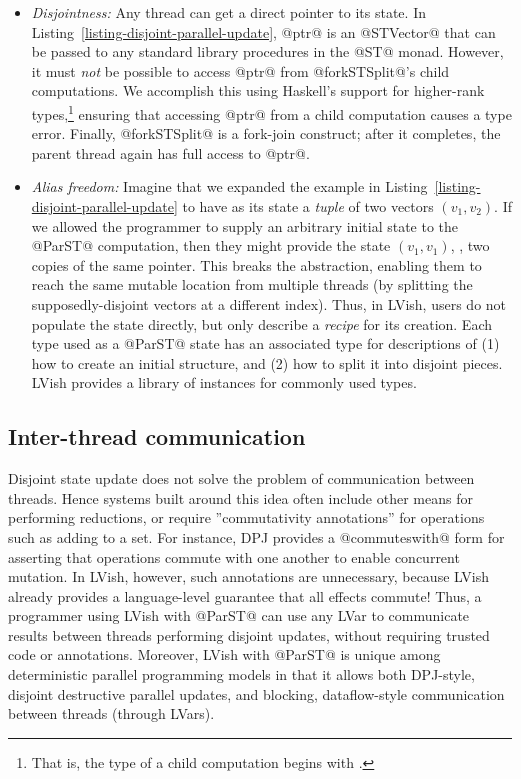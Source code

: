 \begin{itemize}
\item \emph{Disjointness:} Any thread can get a direct pointer to its
  state.  In Listing~\ref{listing-disjoint-parallel-update}, @ptr@ is
  an @STVector@ that can be passed to any standard library procedures
  in the @ST@ monad.  However, it must \emph{not} be possible to
  access @ptr@ from @forkSTSplit@'s child computations.  We accomplish
  this using Haskell's support for higher-rank types,\footnote{That
    is, the type of a child computation begins with .} ensuring that accessing @ptr@ from a child
  computation causes a type error.  Finally, @forkSTSplit@ is a
  fork-join construct; after it completes, the parent thread again has
  full access to @ptr@.

\item \emph{Alias freedom:} Imagine that we expanded the example in
  Listing~\ref{listing-disjoint-parallel-update} to have as its state
  a \emph{tuple} of two vectors $(v_1, v_2)$.  If we allowed the
  programmer to supply an arbitrary initial state to the @ParST@
  computation, then they might provide the state $(v_1, v_1)$, \ie,
  two copies of the same pointer.  This breaks the abstraction,
  enabling them to reach the same mutable location from multiple
  threads (by splitting the supposedly-disjoint vectors at a different
  index).  Thus, in LVish, users do not populate the state directly,
  but only describe a \emph{recipe} for its creation.  Each type used
  as a @ParST@ state has an associated type for descriptions of (1)
  how to create an initial structure, and (2) how to split it into
  disjoint pieces.  LVish provides a library of instances for commonly
  used types.
\end{itemize}

\subsection{Inter-thread communication}

Disjoint state update does not solve the problem of communication
between threads.  Hence systems built around this idea often include
other means for performing reductions, or require ''commutativity
annotations'' for operations such as adding to a set.  For instance,
DPJ provides a @commuteswith@ form for asserting that operations
commute with one another to enable concurrent mutation.  In LVish,
however, such annotations are unnecessary, because LVish already
provides a language-level guarantee that all effects commute!  Thus, a
programmer using LVish with @ParST@ can use any LVar to communicate
results between threads performing disjoint updates, without requiring
trusted code or annotations.  Moreover, LVish with @ParST@ is unique
among deterministic parallel programming models in that it allows both
DPJ-style, disjoint destructive parallel updates, and blocking,
dataflow-style communication between threads (through LVars).
